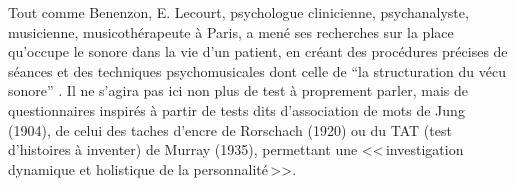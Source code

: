 Tout comme Benenzon, E. Lecourt, psychologue clinicienne,
psychanalyste, musicienne, musicothérapeute à Paris, 
a mené ses recherches sur la place qu'occupe le sonore dans la vie d'un
patient, en créant des procédures précises de séances et des techniques psychomusicales dont celle de 
\enquote{la structuration du vécu sonore} \autocite[119] {lecourt_les_2017}.
Il ne s'agira pas ici non plus de test à proprement parler, mais de questionnaires inspirés à partir de tests dits
d'association de mots de Jung (1904), de celui des taches
d'encre de Rorschach (1920) ou du TAT (test d'histoires à
inventer) de Murray (1935), permettant une <<\,investigation dynamique et holistique de la
      personnalité\,>>\autocite[13] {anzieu.chabert:methodes}.
